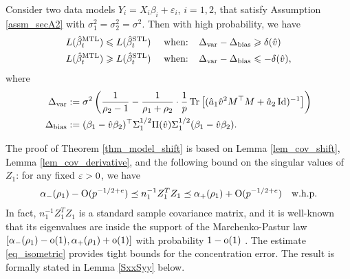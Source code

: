 \begin{theorem}\label{thm_model_shift}
Consider two data models $Y_i = X_i\beta_i + \varepsilon_i$, $i=1,2$, that satisfy Assumption \ref{assm_secA2} with $\sigma_1^2=\sigma_2^2=\sigma^2$. Then with high probability, we have
	\begin{align}
	 	L(\hat{\beta}_{t}^{\text{MTL}}) \leqslant L(\hat{\beta}_t^{\text{STL}}) \quad \text{ when: } \ \ &\Delta_{\text{var}} - \Delta_{\text{bias}} \geqslant   \delta(\hat v) \label{upper}\\
		L(\hat{\beta}_t^{\text{MTL}}) \geqslant L(\hat{\beta}_t^{\text{STL}}) \quad \text{ when: } \ \ &\Delta_{\text{var}} - \Delta_{\text{bias}} \leqslant - \delta(\hat v), \label{lower}
	\end{align}
	where
	\begin{align} %
		\Delta_{\vari} &\define {\sigma^2}\bigbrace{\frac{1}{\rho_2 - 1} -  \frac{1}{\rho_1 + \rho_2}\cdot \frac1p \bigtr{(\hat a_1 \hat v^2 M^{\top}M + \hat a_2\id)^{-1}} } \label{Deltavarv} \\
		\Delta_{\bias} &\define (\beta_1 - \hat{v}\beta_2)^{\top} \Sigma_1^{1/2} \Pi (\hat v)\Sigma_1^{1/2} (\beta_1 - \hat{v}\beta_2). \label{Deltabetav}
	\end{align}
\end{theorem}

The proof of Theorem \ref{thm_model_shift} is based on Lemma \ref{lem_cov_shift}, Lemma \ref{lem_cov_derivative}, and the following bound on the singular values of $Z_1$: for any fixed ${\varepsilon}>0$, we have
\begin{align}
\alpha_-(\rho_1) - \operatorname{O}(p^{-1/2+e})  \preceq {n_1^{-1}}{Z_1^T Z_1}  \preceq   \alpha_+(\rho_1) + \operatorname{O}(p^{-1/2+e}) \quad \text{w.h.p.}  \label{eq_isometric}
\end{align}
In fact, $n_1^{-1}Z_1^TZ_1$ is a standard sample covariance matrix, and it is well-known that its eigenvalues are inside the support of the Marchenko-Pastur law $[\alpha_-(\rho_1)-\operatorname{o}(1) ,\alpha_+(\rho_1)+\operatorname{o}(1)]$ with probability $1-\operatorname{o}(1)$ \cite{No_outside}. The estimate \eqref{eq_isometric} provides tight bounds for the concentration error. The result is formally stated in Lemma \ref{SxxSyy} below.

